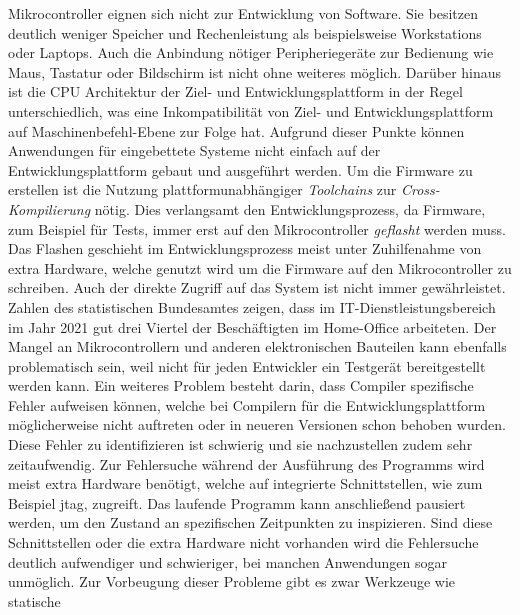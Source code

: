 Mikrocontroller eignen sich nicht zur Entwicklung von Software.
Sie besitzen deutlich weniger Speicher und Rechenleistung als beispielsweise
Workstations oder Laptops.
Auch die Anbindung nötiger Peripheriegeräte zur Bedienung wie Maus, Tastatur
oder Bildschirm ist nicht ohne weiteres möglich.
Darüber hinaus ist die CPU Architektur der Ziel- und Entwicklungsplattform in
der Regel unterschiedlich, was eine Inkompatibilität von Ziel- und
Entwicklungsplattform auf Maschinenbefehl-Ebene zur Folge hat.\newline
Aufgrund dieser Punkte können Anwendungen für eingebettete Systeme nicht
einfach auf der Entwicklungsplattform gebaut und ausgeführt werden.
Um die Firmware zu erstellen ist die Nutzung plattformunabhängiger
\textit{Toolchains} zur \textit{Cross-Kompilierung} nötig.
Dies verlangsamt den Entwicklungsprozess, da Firmware, zum Beispiel für Tests,
immer erst auf den Mikrocontroller \textit{geflasht} werden muss.
Das Flashen geschieht im Entwicklungsprozess meist unter Zuhilfenahme
von extra Hardware, welche genutzt wird um die Firmware auf den Mikrocontroller
zu schreiben.\newline
Auch der direkte Zugriff auf das System ist nicht immer gewährleistet.
Zahlen des statistischen Bundesamtes zeigen, dass im IT-Dienstleistungsbereich
im Jahr 2021 gut drei Viertel der Beschäftigten im Home-Office
arbeiteten\cite{DestatisHomeOffice}.
Der Mangel an Mikrocontrollern und anderen elektronischen Bauteilen kann
ebenfalls problematisch sein, weil nicht für jeden Entwickler ein Testgerät
bereitgestellt werden kann.\newline
Ein weiteres Problem besteht darin, dass Compiler spezifische Fehler aufweisen
können, welche bei Compilern für die Entwicklungsplattform möglicherweise nicht
auftreten\cite{DebGccBug}\cite{LaunchpadGccBug} oder in neueren Versionen schon
behoben wurden.
Diese Fehler zu identifizieren ist schwierig und sie nachzustellen zudem
sehr zeitaufwendig.\newline
Zur Fehlersuche während der Ausführung des Programms wird meist extra Hardware
benötigt, welche auf integrierte Schnittstellen, wie zum Beispiel
\acs{jtag}, zugreift.
Das laufende Programm kann anschließend pausiert werden, um den Zustand an
spezifischen Zeitpunkten zu inspizieren.
Sind diese Schnittstellen oder die extra Hardware nicht vorhanden wird die
Fehlersuche deutlich aufwendiger und schwieriger, bei manchen Anwendungen sogar
unmöglich.
Zur Vorbeugung dieser Probleme gibt es zwar Werkzeuge wie statische
